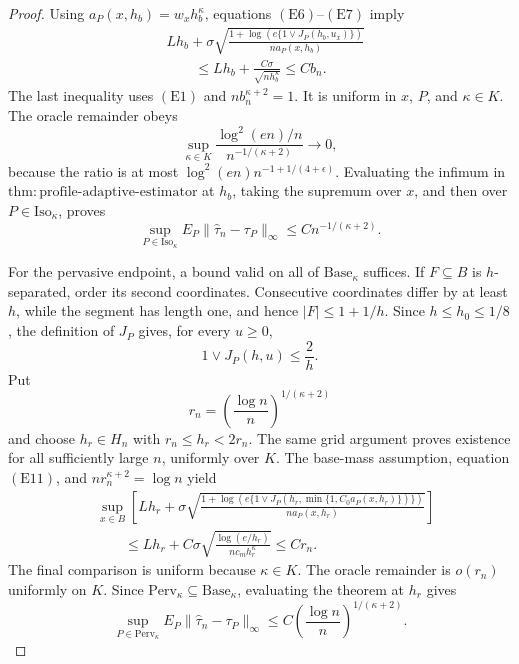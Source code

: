 \documentclass{article}
\begin{document}
\begin{proof}
Using \(a_P(x,h_b)=w_xh_b^\kappa\), equations
\((\mathrm{E6})\)--\((\mathrm{E7})\) imply
\[
\begin{aligned}
 &Lh_b+\sigma\sqrt{
 \frac{1+\log\!\left(e\{1\vee J_P(h_b,u_x)\}\right)}
 {n a_P(x,h_b)}}\\
 &\qquad\leq Lh_b+\frac{C\sigma}{\sqrt{nh_b^\kappa}}
 \leq Cb_n.
\end{aligned}
 \tag{E8}
\]
The last inequality uses \((\mathrm{E1})\) and
\(nb_n^{\kappa+2}=1\).  It is uniform in \(x\), \(P\), and
\(\kappa\in K\).  The oracle remainder obeys
\[
 \sup_{\kappa\in K}
 \frac{\log^2(en)/n}{n^{-1/(\kappa+2)}}\longrightarrow0,
 \tag{E9}
\]
because the ratio is at most
\(\log^2(en)n^{-1+1/(4+\epsilon)}\).  Evaluating the infimum in
\(\mathrm{thm{:}profile\text{-}adaptive\text{-}estimator}\) at \(h_b\), taking the supremum over \(x\), and then over
\(P\in\mathrm{Iso}_\kappa\), proves
\[
 \sup_{P\in\mathrm{Iso}_\kappa}
 E_P\|\widehat\tau_n-\tau_P\|_\infty
 \leq Cn^{-1/(\kappa+2)}.
 \tag{E10}
\]

For the pervasive endpoint, a bound valid on all of
\(\mathrm{Base}_\kappa\) suffices.  If \(F\subseteq B\) is
\(h\)-separated, order its second coordinates.  Consecutive coordinates differ by at least \(h\), while the segment has length one, and hence
\(|F|\leq1+1/h\).  Since \(h\leq h_0\leq1/8\), the definition of
\(J_P\) gives, for every \(u\geq0\),
\[
 1\vee J_P(h,u)\leq\frac2h.
 \tag{E11}
\]
Put
\[
 r_n=\left(\frac{\log n}{n}\right)^{1/(\kappa+2)}
\]
and choose \(h_r\in H_n\) with
\(r_n\leq h_r<2r_n\).  The same grid argument proves existence for all sufficiently large \(n\), uniformly over \(K\).  The base-mass assumption, equation \((\mathrm{E11})\), and
\(nr_n^{\kappa+2}=\log n\) yield
\[
\begin{aligned}
 &\sup_{x\in B}\left[
 Lh_r+\sigma\sqrt{
 \frac{1+\log\!\left(e\{1\vee
 J_P(h_r,\min\{1,C_0a_P(x,h_r)\})\}\right)}
 {n a_P(x,h_r)}}\right]\\
 &\qquad\leq Lh_r+C\sigma
 \sqrt{\frac{\log(e/h_r)}{nc_mh_r^\kappa}}
 \leq Cr_n.
\end{aligned}
 \tag{E12}
\]
The final comparison is uniform because \(\kappa\in K\).  The oracle remainder is \(o(r_n)\) uniformly on \(K\).  Since
\(\mathrm{Perv}_\kappa\subseteq\mathrm{Base}_\kappa\), evaluating the theorem at \(h_r\) gives
\[
 \sup_{P\in\mathrm{Perv}_\kappa}
 E_P\|\widehat\tau_n-\tau_P\|_\infty
 \leq C\left(\frac{\log n}{n}\right)^{1/(\kappa+2)}.
 \tag{E13}
\]


\end{proof}
\end{document}
